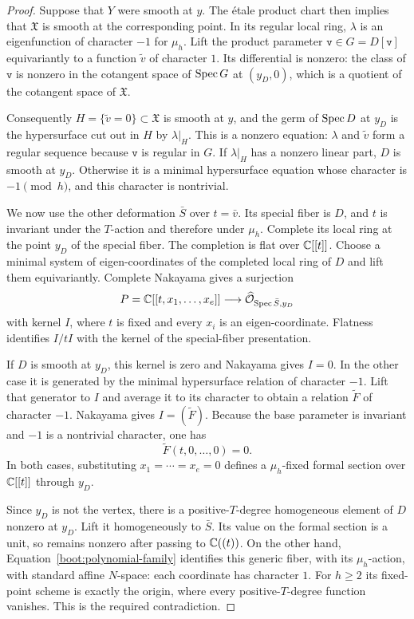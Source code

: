 \begin{proof}
Suppose that $Y$ were smooth at $y$.  The étale product chart
then implies that $\mathfrak X$ is smooth at the corresponding
point.  In its regular local ring, $\lambda$ is an eigenfunction
of character $-1$ for $\mu_h$.  Lift the product parameter
$\mathtt v\in G=D[\mathtt v]$ equivariantly to a function
$\widetilde v$ of character $1$.  Its differential is nonzero:
the class of $\mathtt v$ is nonzero in the cotangent space of
$\operatorname{Spec} G$ at $(y_D,0)$, which is a quotient of the cotangent
space of $\mathfrak X$.

Consequently $H=\{\widetilde v=0\}\subset\mathfrak X$ is
smooth at $y$, and the germ of $\operatorname{Spec} D$ at $y_D$ is the
hypersurface cut out in $H$ by $\lambda|_H$.  This is a
nonzero equation: $\lambda$ and $\widetilde v$ form a regular
sequence because $\mathtt v$ is regular in $G$.  If
$\lambda|_H$ has a nonzero linear part, $D$ is smooth at
$y_D$.  Otherwise it is a minimal hypersurface equation whose
character is $-1\pmod h$, and this character is nontrivial.

We now use the other deformation $\bar S$ over
$t=\bar v$.  Its special fiber is $D$, and $t$ is invariant
under the $T$-action and therefore under $\mu_h$.  Complete its
local ring at the point $y_D$ of the special fiber.  The
completion is flat over $\mathbb C[[t]]$.  Choose a minimal system
of eigen-coordinates of the completed local ring of $D$ and
lift them equivariantly.  Complete Nakayama gives a surjection
\[
 P=\mathbb C[[t,x_1,\ldots,x_e]]\longrightarrow
 \widehat{\mathcal O}_{\operatorname{Spec}\bar S,y_D}
\]
with kernel $I$, where $t$ is fixed and every $x_i$ is an
eigen-coordinate.  Flatness identifies $I/tI$ with the kernel
of the special-fiber presentation.

If $D$ is smooth at $y_D$, this kernel is zero and Nakayama
gives $I=0$.  In the other case it is generated by the minimal
hypersurface relation of character $-1$.  Lift that generator
to $I$ and average it to its character to obtain a relation
$\widetilde F$ of character $-1$.  Nakayama gives
$I=(\widetilde F)$.  Because the base parameter is invariant
and $-1$ is a nontrivial character, one has
\[
 \widetilde F(t,0,\ldots,0)=0.
\]
In both cases, substituting $x_1=\cdots=x_e=0$ defines a
$\mu_h$-fixed formal section over $\mathbb C[[t]]$ through $y_D$.

Since $y_D$ is not the vertex, there is a positive-$T$-degree
homogeneous element of $D$ nonzero at $y_D$.  Lift it
homogeneously to $\bar S$.  Its value on the formal section
is a unit, so remains nonzero after passing to $\mathbb C((t))$.
On the other hand, Equation~\eqref{boot:polynomial-family}
identifies this generic fiber, with its $\mu_h$-action, with
standard affine $N$-space: each coordinate has character $1$.
For $h\geq2$ its fixed-point scheme is exactly the origin,
where every positive-$T$-degree function vanishes.  This is
the required contradiction.
\end{proof}

